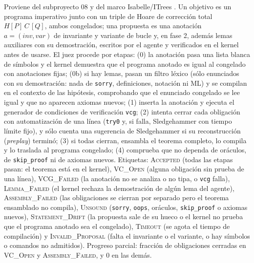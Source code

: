 \documentclass[11pt,a4paper]{article}
\begin{document}
Proviene del subproyecto 08 y del marco Isabelle/ITrees \citep{BryantHuertaFoster2026}. Un objetivo es un programa imperativo junto con un triple de Hoare de corrección total $H[P]\,C\,[Q]$, ambos congelados; una propuesta es una anotación $a = (\mathit{inv}, \mathit{var})$ de invariante y variante de bucle y, en fase 2, además lemas auxiliares con su demostración, escritos por el agente y verificados en el kernel antes de usarse. El juez procede por etapas: (0) la anotación pasa una lista blanca de símbolos y el kernel demuestra que el programa anotado es igual al congelado con anotaciones fijas; (0b) si hay lemas, pasan un filtro léxico (sólo enunciados con su demostración: nada de \texttt{sorry}, definiciones, notación ni ML) y se compilan en el contexto de las hipótesis, comprobando que el enunciado congelado se lee igual y que no aparecen axiomas nuevos; (1) inserta la anotación y ejecuta el generador de condiciones de verificación \texttt{vcg}; (2) intenta cerrar cada obligación con automatización de una línea (\texttt{try0} y, si falla, Sledgehammer con tiempo límite fijo), y sólo cuenta una sugerencia de Sledgehammer si su reconstrucción (\emph{preplay}) terminó; (3) si todas cierran, ensambla el teorema completo, lo compila y lo traslada al programa congelado; (4) comprueba que no dependa de oráculos, de \texttt{skip\_proof} ni de axiomas nuevos. Etiquetas: \textsc{Accepted} (todas las etapas pasan: el teorema está en el kernel), \textsc{VC\_Open} (alguna obligación sin prueba de una línea), \textsc{VCG\_Failed} (la anotación no se analiza o no tipa, o \texttt{vcg} falla), \textsc{Lemma\_Failed} (el kernel rechaza la demostración de algún lema del agente), \textsc{Assembly\_Failed} (las obligaciones se cierran por separado pero el teorema ensamblado no compila), \textsc{Unsound} (\texttt{sorry}, \texttt{oops}, oráculos, \texttt{skip\_proof} o axiomas nuevos), \textsc{Statement\_Drift} (la propuesta sale de su hueco o el kernel no prueba que el programa anotado sea el congelado), \textsc{Timeout} (se agota el tiempo de compilación) y \textsc{Invalid\_Proposal} (falta el invariante o el variante, o hay símbolos o comandos no admitidos). Progreso parcial: fracción de obligaciones cerradas en \textsc{VC\_Open} y \textsc{Assembly\_Failed}, y $0$ en las demás.
\end{document}
